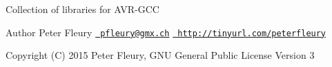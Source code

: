Collection of libraries for A\+V\+R-\/\+G\+CC \begin{DoxyAuthor}{Author}
Peter Fleury \href{mailto:pfleury@gmx.ch}{\texttt{ pfleury@gmx.\+ch}} \href{http://tinyurl.com/peterfleury}{\texttt{ http\+://tinyurl.\+com/peterfleury}} 
\end{DoxyAuthor}
\begin{DoxyCopyright}{Copyright}
(C) 2015 Peter Fleury, G\+NU General Public License Version 3 
\end{DoxyCopyright}
